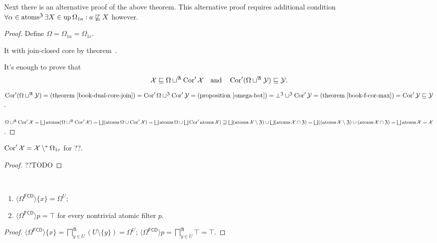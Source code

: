 Next there is an alternative proof of the above theorem.
This alternative proof requires additional condition
$\forall \alpha \in \operatorname{atoms}^{\mathfrak{Z}} \exists X \in \operatorname{up} \Omega_{1a} : a
\not\sqsubseteq X$ however.

\begin{proof}
Define $\Omega = \Omega_{1a} = \Omega_{1c}$.

It with join-closed core by theorem~.

It's enough to prove that
\[
\mathcal{X}\sqsubseteq\Omega\sqcup^{\mathfrak{A}}\operatorname{Cor}'\mathcal{X}\quad\text{and}\quad\operatorname{Cor}'(\Omega\sqcup^{\mathfrak{A}}\mathcal{Y})\sqsubseteq\mathcal{Y}.
\]
$\Cor'(\Omega\sqcup^{\mathfrak{A}}\mathcal{Y}) =
\text{(theorem~\bookref{dual-core-join})} =
\Cor'\Omega\sqcup^{\mathfrak{Z}}\Cor'\mathcal{Y} =
\text{(proposition~\ref{omega-bot})} =
\bot^{\mathfrak{Z}}\sqcup^{\mathfrak{Z}}\Cor'\mathcal{Y} =
\text{(theorem~\bookref{f-cor-max})} =
\Cor'\mathcal{Y}\sqsubseteq\mathcal{Y}$.

$\Omega\sqcup^{\mathfrak{A}}\Cor'\mathcal{X} =
\bigsqcup\atoms(\Omega\sqcup^{\mathfrak{A}}\Cor'\mathcal{X}) =
\bigsqcup(\atoms\Omega\cup\Cor'\mathcal{X}) =
\bigsqcup\atoms\Omega\sqcup\bigsqcup\Cor'\atoms\mathcal{X}) \sqsupseteq
\bigsqcup(\atoms\mathcal{X}\setminus\mathfrak{Z}) \sqcup
\bigsqcup(\atoms\mathcal{X}\cap\mathfrak{Z}) =
\bigsqcup((\atoms\mathcal{X}\setminus\mathfrak{Z}) \cup
(\atoms\mathcal{X}\cap\mathfrak{Z}) =
\bigsqcup\atoms\mathcal{X} = \mathcal{X}$.
\end{proof}

\begin{prop}
$\operatorname{Cor}'\mathcal{X} = \mathcal{X}\setminus^{\ast}\Omega_{1c}$ for ??.
\end{prop}

\begin{proof}
??TODO
\end{proof}

\begin{prop}
  ~  
  \begin{enumerate}
    \item $\langle \Omega^{\mathsf{FCD}} \rangle \{ x \} = \Omega^U$;
    
    \item $\langle \Omega^{\mathsf{FCD}} \rangle p = \top$ for every
    nontrivial atomic filter $p$.
  \end{enumerate}
\end{prop}

\begin{proof}
  $\langle \Omega^{\mathsf{FCD}} \rangle \{ x \} =
  \bigsqcap^{\mathfrak{A}}_{y \in U} (U \setminus \{ y \}) = \Omega^U$;
  $\langle \Omega^{\mathsf{FCD}} \rangle p = \bigsqcap^{\mathfrak{A}}_{y
  \in U} \top = \top$.
\end{proof}

